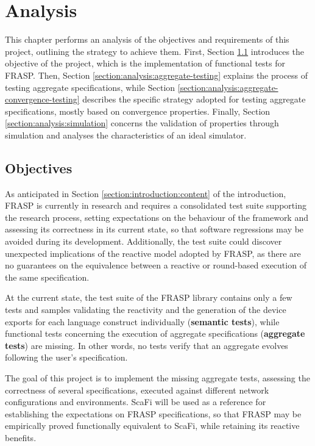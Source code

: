 
\chapter{Analysis}
\label{chapter:analysis}

This chapter performs an analysis of the objectives and requirements of this
project, outlining the strategy to achieve them. First, Section
\ref{section:analysis:objectives} introduces the objective of the project,
which is the implementation of functional tests for FRASP. Then, Section
\ref{section:analysis:aggregate-testing} explains the process of testing
aggregate specifications, while Section
\ref{section:analysis:aggregate-convergence-testing} describes the specific
strategy adopted for testing aggregate specifications, mostly based on
convergence properties. Finally, Section \ref{section:analysis:simulation}
concerns the validation of properties through simulation and analyses the
characteristics of an ideal simulator.

\section{Objectives}
\label{section:analysis:objectives}

As anticipated in Section \ref{section:introduction:content} of the
introduction, FRASP is currently in research and requires a consolidated test
suite supporting the research process, setting expectations on the behaviour of
the framework and assessing its correctness in its current state, so that
software regressions may be avoided during its development. Additionally, the
test suite could discover unexpected implications of the reactive model adopted
by FRASP, as there are no guarantees on the equivalence between a reactive or
round-based execution of the same specification.

At the current state, the test suite of the FRASP library contains only a few
tests and samples validating the reactivity and the generation of the device
exports for each language construct individually (\textbf{semantic tests}),
while functional tests concerning the execution of aggregate specifications
(\textbf{aggregate tests}) are missing. In other words, no tests verify that an
aggregate evolves following the user's specification.

The goal of this project is to implement the missing aggregate tests, assessing
the correctness of several specifications, executed against different network
configurations and environments. \ac{ScaFi} will be used as a reference for
establishing the expectations on FRASP specifications, so that FRASP may be
empirically proved functionally equivalent to \ac{ScaFi}, while retaining its
reactive benefits.

